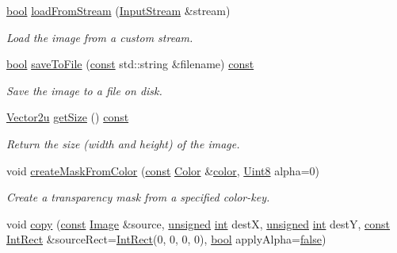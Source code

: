 \begin{DoxyCompactItemize}
\hyperlink{term__entry_8h_a002004ba5d663f149f6c38064926abac}{bool} \hyperlink{classsf_1_1_image_a21122ded0e8368bb06ed3b9acfbfb501}{load\-From\-Stream} (\hyperlink{classsf_1_1_input_stream}{Input\-Stream} \&stream)
\begin{DoxyCompactList}\small\item\em Load the image from a custom stream. \end{DoxyCompactList}\item 
\hyperlink{term__entry_8h_a002004ba5d663f149f6c38064926abac}{bool} \hyperlink{classsf_1_1_image_aec0ed16b67df7b512aaa5c53388ba14e}{save\-To\-File} (\hyperlink{term__entry_8h_a57bd63ce7f9a353488880e3de6692d5a}{const} std\-::string \&filename) \hyperlink{term__entry_8h_a57bd63ce7f9a353488880e3de6692d5a}{const} 
\begin{DoxyCompactList}\small\item\em Save the image to a file on disk. \end{DoxyCompactList}\item 
\hyperlink{namespacesf_a41039649eb65ea7646e2b97cfe124b4f}{Vector2u} \hyperlink{classsf_1_1_image_a5c3e9bebdc001c3ebf85ca97039fc86b}{get\-Size} () \hyperlink{term__entry_8h_a57bd63ce7f9a353488880e3de6692d5a}{const} 
\begin{DoxyCompactList}\small\item\em Return the size (width and height) of the image. \end{DoxyCompactList}\item 
void \hyperlink{classsf_1_1_image_a22f13f8c242a6b38eb73cc176b37ae34}{create\-Mask\-From\-Color} (\hyperlink{term__entry_8h_a57bd63ce7f9a353488880e3de6692d5a}{const} \hyperlink{classsf_1_1_color}{Color} \&\hyperlink{_entity_8cpp_a864889304a90873adb9c6e289a54bcf4}{color}, \hyperlink{namespacesf_a4ef3d630785c4f296f9b4f274c33d78e}{Uint8} alpha=0)
\begin{DoxyCompactList}\small\item\em Create a transparency mask from a specified color-\/key. \end{DoxyCompactList}\item 
void \hyperlink{classsf_1_1_image_ab2fa337c956f85f93377dcb52153a45a}{copy} (\hyperlink{term__entry_8h_a57bd63ce7f9a353488880e3de6692d5a}{const} \hyperlink{classsf_1_1_image}{Image} \&source, \hyperlink{curses_8priv_8h_aca40206900cfc164654362fa8d4ad1e6}{unsigned} \hyperlink{term__entry_8h_ad65b480f8c8270356b45a9890f6499ae}{int} dest\-X, \hyperlink{curses_8priv_8h_aca40206900cfc164654362fa8d4ad1e6}{unsigned} \hyperlink{term__entry_8h_ad65b480f8c8270356b45a9890f6499ae}{int} dest\-Y, \hyperlink{term__entry_8h_a57bd63ce7f9a353488880e3de6692d5a}{const} \hyperlink{namespacesf_a1b1279ab06950b96686cffaacb72fed5}{Int\-Rect} \&source\-Rect=\hyperlink{namespacesf_a1b1279ab06950b96686cffaacb72fed5}{Int\-Rect}(0, 0, 0, 0), \hyperlink{term__entry_8h_a002004ba5d663f149f6c38064926abac}{bool} apply\-Alpha=\hyperlink{_snake_8cpp_ae6c865df784842196d411c1466b01686}{false})

\end{DoxyCompactItemize}
